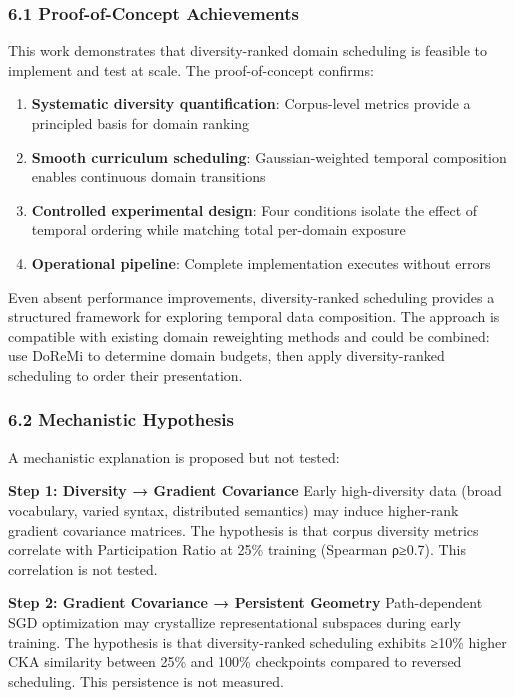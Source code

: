 
\subsubsection{6.1 Proof-of-Concept Achievements}

This work demonstrates that diversity-ranked domain scheduling is feasible to implement and test at scale. The proof-of-concept confirms:

\begin{enumerate}
\item \textbf{Systematic diversity quantification}: Corpus-level metrics provide a principled basis for domain ranking
\item \textbf{Smooth curriculum scheduling}: Gaussian-weighted temporal composition enables continuous domain transitions
\item \textbf{Controlled experimental design}: Four conditions isolate the effect of temporal ordering while matching total per-domain exposure
\item \textbf{Operational pipeline}: Complete implementation executes without errors
\end{enumerate}

Even absent performance improvements, diversity-ranked scheduling provides a structured framework for exploring temporal data composition. The approach is compatible with existing domain reweighting methods and could be combined: use DoReMi to determine domain budgets, then apply diversity-ranked scheduling to order their presentation.

\subsubsection{6.2 Mechanistic Hypothesis}

A mechanistic explanation is proposed but not tested:

\textbf{Step 1: Diversity → Gradient Covariance}
Early high-diversity data (broad vocabulary, varied syntax, distributed semantics) may induce higher-rank gradient covariance matrices. The hypothesis is that corpus diversity metrics correlate with Participation Ratio at 25\% training (Spearman ρ≥0.7). This correlation is not tested.

\textbf{Step 2: Gradient Covariance → Persistent Geometry}
Path-dependent SGD optimization may crystallize representational subspaces during early training. The hypothesis is that diversity-ranked scheduling exhibits ≥10\% higher CKA similarity between 25\% and 100\% checkpoints compared to reversed scheduling. This persistence is not measured.

